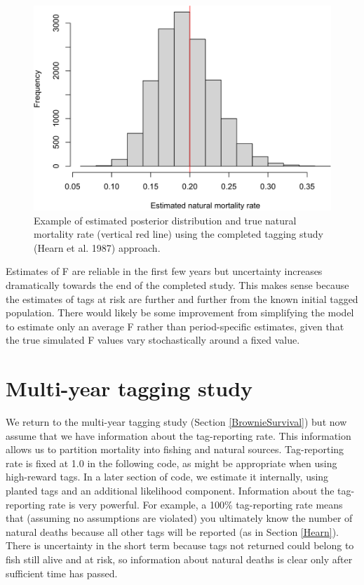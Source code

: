 \documentclass[
]{krantz}
\begin{document}
\begin{figure}
\includegraphics[width=0.9\linewidth]{bookdown_files/figure-latex/HearnPlot-1} \caption{Example of estimated posterior distribution and true natural mortality rate (vertical red line) using the completed tagging study (Hearn et al. 1987) approach.}\label{fig:HearnPlot}
\end{figure}

Estimates of F are reliable in the first few years but uncertainty increases dramatically towards the end of the completed study. This makes sense because the estimates of tags at risk are further and further from the known initial tagged population. There would likely be some improvement from simplifying the model to estimate only an average F rather than period-specific estimates, given that the true simulated F values vary stochastically around a fixed value.

\hypertarget{BrownieFandM}{%
\section{Multi-year tagging study}\label{BrownieFandM}}

We return to the multi-year tagging study (Section \ref{BrownieSurvival}) but now assume that we have information about the tag-reporting rate. This information allows us to partition mortality into fishing and natural sources. Tag-reporting rate is fixed at 1.0 in the following code, as might be appropriate when using high-reward tags. In a later section of code, we estimate it internally, using planted tags \citep{hearn.etal2003} and an additional likelihood component. Information about the tag-reporting rate is very powerful. For example, a 100\% tag-reporting rate means that (assuming no assumptions are violated) you ultimately know the number of natural deaths because all other tags will be reported (as in Section \ref{Hearn}). There is uncertainty in the short term because tags not returned could belong to fish still alive and at risk, so information about natural deaths is clear only after sufficient time has passed.
\end{document}
